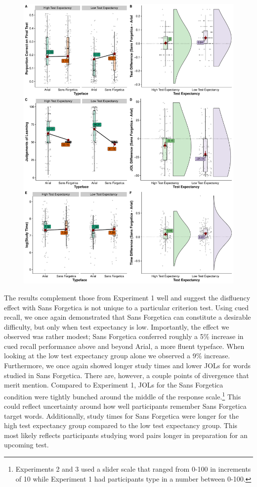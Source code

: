 \documentclass[
  english,
  jou]{apa7}
\begin{document}
\begin{figure}

{\centering \includegraphics{Testing_Expectancy_SF_RR_files/figure-latex/unnamed-chunk-56-1} 

}

\caption{ }\label{fig:unnamed-chunk-56}
\end{figure}

The results complement those from Experiment 1 well and suggest the disfluency effect with Sans Forgetica is not unique to a particular criterion test. Using cued recall, we once again demonstrated that Sans Forgetica can constitute a desirable difficulty, but only when test expectancy is low. Importantly, the effect we observed was rather modest; Sans Forgetica conferred roughly a 5\% increase in cued recall performance above and beyond Arial, a more fluent typeface. When looking at the low test expectancy group alone we observed a 9\% increase. Furthermore, we once again showed longer study times and lower JOLs for words studied in Sans Forgetica. There are, however, a couple points of divergence that merit mention. Compared to Experiment 1, JOLs for the Sans Forgetica condition were tightly bunched around the middle of the response scale.\footnote{Experiments 2 and 3 used a slider scale that ranged from 0-100 in increments of 10 while Experiment 1 had participants type in a number between 0-100.} This could reflect uncertainty around how well participants remember Sans Forgetica target words. Additionally, study times for Sans Forgetica were longer for the high test expectancy group compared to the low test expectancy group. This most likely reflects participants studying word pairs longer in preparation for an upcoming test.
\end{document}
